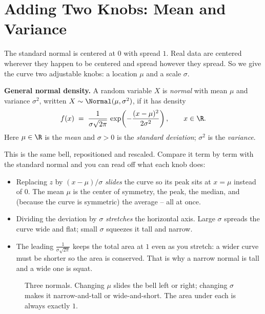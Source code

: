 \section{Adding Two Knobs: Mean and Variance}
\label{ch12:general}

The standard normal is centered at $0$ with spread $1$. Real data are centered
wherever they happen to be centered and spread however they spread. So we give
the curve two adjustable knobs: a location $\mu$ and a scale $\sigma$.

\begin{formalbox}
\textbf{General normal density.} A random variable $X$ is \emph{normal} with mean
$\mu$ and variance $\sigma^2$, written $X \sim \Normal(\mu, \sigma^2)$, if it has
density
\[
  f(x) \;=\; \frac{1}{\sigma\sqrt{2\pi}}\,
              \exp\!\left(-\frac{(x-\mu)^2}{2\sigma^2}\right),
  \qquad x \in \R.
\]
Here $\mu \in \R$ is the \emph{mean} and $\sigma > 0$ is the \emph{standard
deviation}; $\sigma^2$ is the \emph{variance}.
\end{formalbox}

This is the same bell, repositioned and rescaled. Compare it term by term with
the standard normal and you can read off what each knob does:

\begin{itemize}
  \item Replacing $z$ by $(x-\mu)/\sigma$ \emph{slides} the curve so its peak sits
  at $x=\mu$ instead of $0$. The mean $\mu$ is the center of symmetry, the peak,
  the median, and (because the curve is symmetric) the average -- all at once.
  \item Dividing the deviation by $\sigma$ \emph{stretches} the horizontal axis.
  Large $\sigma$ spreads the curve wide and flat; small $\sigma$ squeezes it tall
  and narrow.
  \item The leading $\tfrac{1}{\sigma\sqrt{2\pi}}$ keeps the total area at $1$ even
  as you stretch: a wider curve must be shorter so the area is conserved. That is
  why a narrow normal is tall and a wide one is squat.
\end{itemize}

\begin{figure}[H]
\centering
{}
\caption{Three normals. Changing $\mu$ slides the bell left or right; changing
$\sigma$ makes it narrow-and-tall or wide-and-short. The area under each is
always exactly $1$.}
\label{ch12:fig-three}
\end{figure}


